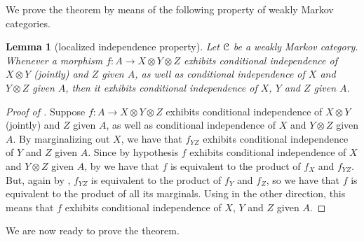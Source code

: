 \documentclass[a4paper,UKenglish,numberwithinsect,cleveref, autoref, thm-restate]{lipics-v2021}
\theoremstyle{plain} %
\newtheorem{mylemma}[mytheorem]{Lemma}
\theoremstyle{definition} %
\begin{document}
We prove the theorem by means of the following property of weakly Markov categories.

\begin{mylemma}[localized independence property]\label{local}
 Let $\mathcal{C}$ be a weakly Markov category. Whenever a morphism  $f:A\to X\otimes Y\otimes Z$ exhibits conditional independence of $X\otimes Y$ (jointly) and $Z$ given $A$, as well as conditional independence of $X$ and $Y\otimes Z$ given $A$, then it exhibits conditional independence of $X$, $Y$ and $Z$ given $A$. 
\end{mylemma}
\begin{proof}[Proof of ]
 Suppose $f:A\to X\otimes Y\otimes Z$ exhibits conditional independence of $X\otimes Y$ (jointly) and $Z$ given $A$, as well as conditional independence of $X$ and $Y\otimes Z$ given $A$.
 By marginalizing out $X$, we have that $f_{YZ}$ exhibits conditional independence of $Y$ and $Z$ given $A$. 
 Since by hypothesis $f$ exhibits conditional independence of $X$ and $Y\otimes Z$ given $A$, by  we have that $f$ is equivalent to the product  of $f_X$ and $f_{YZ}$. But, again by , $f_{YZ}$ is equivalent to the product of $f_Y$ and $f_Z$, so we have that $f$ is equivalent to the product of all its marginals. Using  in the other direction, this means that $f$ exhibits conditional independence of $X$, $Y$ and $Z$ given $A$. 
\end{proof}
 
We are now ready to prove the theorem.
\end{document}
